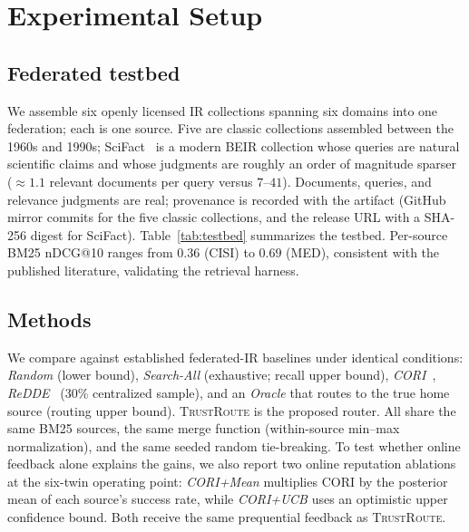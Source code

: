\documentclass[preprint,12pt]{elsarticle}
\newcommand{\system}{\textsc{TrustRoute}}
\begin{document}
\section{Experimental Setup}\label{sec:setup}

\subsection{Federated testbed}
We assemble six openly licensed IR collections spanning six domains into
one federation; each is one source. Five are classic collections assembled
between the 1960s and 1990s; SciFact~\cite{wadden2020fact} is a modern BEIR
collection whose queries are natural scientific claims and whose judgments are
roughly an order of magnitude sparser ($\approx1.1$ relevant documents per query
versus $7$--$41$). Documents, queries, and relevance judgments
are real; provenance is recorded with the artifact (GitHub mirror commits for
the five classic collections, and the release URL with a SHA-256 digest for
SciFact).
Table~\ref{tab:testbed} summarizes the testbed. Per-source BM25 nDCG@10 ranges
from $0.36$ (CISI) to $0.69$ (MED), consistent with the published literature,
validating the retrieval harness.

\begin{table}[t]
\centering
\caption{Federated testbed: six heterogeneous real collections
(23{,}709 documents, 776 judged queries).}
\label{tab:testbed}
\small

\end{table}

\subsection{Methods}
We compare against established federated-IR baselines under identical conditions:
\emph{Random} (lower bound), \emph{Search-All} (exhaustive; recall upper bound),
\emph{CORI}~\cite{callan1995cori}, \emph{ReDDE}~\cite{si2003redde} (30\%
centralized sample), and an \emph{Oracle} that routes to the true home source
(routing upper bound). \system{} is the proposed router. All share the same BM25
sources, the same merge function (within-source min--max normalization), and the
same seeded random tie-breaking.
To test whether online feedback alone explains the gains, we also report two
online reputation ablations at the six-twin operating point: \emph{CORI+Mean}
multiplies CORI by the posterior mean of each source's success rate, while
\emph{CORI+UCB} uses an optimistic upper confidence bound. Both receive the same
prequential feedback as \system{}.
\end{document}
